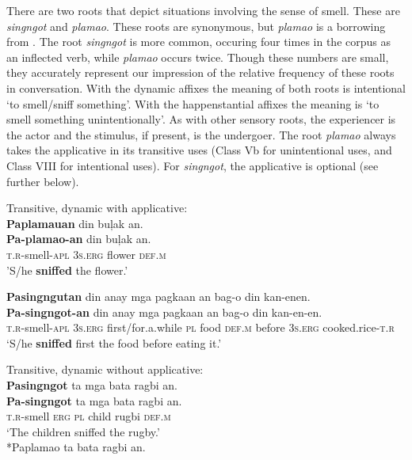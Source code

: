 There are two roots that depict situations involving the sense of smell. These are  \textit{singngot} and \textit{plamao}. These roots are synonymous, but \textit{plamao} is a borrowing from . The root \textit{singngot} is more common, occuring four times in the corpus as an inflected verb, while \textit{plamao} occurs twice. Though these numbers are small, they accurately represent our impression of the relative frequency of these roots in conversation. With the dynamic affixes the meaning of both roots is intentional ‘to smell/sniff something’. With the happenstantial affixes the meaning is ‘to smell something unintentionally’. As with other sensory roots, the experiencer is the actor and the stimulus, if present, is the undergoer. The root \textit{plamao} always takes the applicative in its transitive uses (Class Vb for unintentional uses, and Class VIII for intentional uses). For \textit{singngot}, the applicative is optional (see further below).

\newpage
\ea
Transitive, dynamic with applicative: \\
\textbf{Paplamauan}  din  buļak  an. \\\smallskip
\gll \textbf{Pa-plamao-an}  din  buļak  an. \\
\textsc{t.r}-smell-\textsc{apl}  3\textsc{s.erg}  flower \textsc{def.m} \\
\glt ’S/he \textbf{sniffed} the flower.’
\z

\ea
\textbf{Pasingngutan}  din  anay  mga  pagkaan  an  bag-o  din kan-enen. \\\smallskip
\gll \textbf{Pa-singngot-an}  din  anay  mga  pagkaan  an  bag-o  din kan-en-en. \\
\textsc{t.r}-smell-\textsc{apl}  3\textsc{s.erg}  first/for.a.while  \textsc{pl}  food  \textsc{def.m}  before  3\textsc{s.erg} cooked.rice-\textsc{t.r} \\
\glt ‘S/he \textbf{sniffed} first the food before eating it.’
\z

\ea Transitive, dynamic without applicative: \\
\textbf{Pasingngot} ta mga bata ragbi an. \\\smallskip
\gll \textbf{Pa-singngot} ta mga bata ragbi an.\\
\textsc{t.r}-smell \textsc{erg} \textsc{pl} child rugbi \textsc{def.m} \\
\glt `The children sniffed the rugby.' \\\smallskip
*Paplamao ta bata ragbi an.
\z

